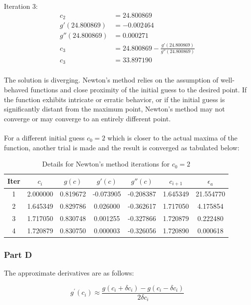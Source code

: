 \documentclass[12pt, a4paper]{article}
\numberwithin{equation}{section}
\begin{document}
Iteration 3:
\begin{equation}
\begin{align}
c_{2} &= 24.800869\\
g'(24.800869) &= -0.002464 \\
g''(24.800869) &= 0.000271 \\
c_{3} &= 24.800869 - \frac{g'(24.800869)}{g''(24.800869)}\\
c_{3} &= 33.897190\\
\end{align}    
\end{equation}


The solution is diverging. Newton's method relies on the assumption of well-behaved functions and close proximity of the initial guess to the desired point. If the function exhibits intricate or erratic behavior, or if the initial guess is significantly distant from the maximum point, Newton's method may not converge or may converge to an entirely different point.\\
\\
For a different initial guess $c_0 = 2$ which is closer to the actual maxima of the function, another trial is made and the result is converged as tabulated below:

\begin{table}[htbp]
  \centering
  \caption{Details for Newton's method iterations for $c_0 = 2$}
  \begin{tabular}{ccccccc}
    \hline
    Iter & $c_i$ & $g(c)$ & $g'(c)$ & $g''(c)$ & $c_{i+1}$ & $\epsilon_a$ \\ \hline
    1 & 2.000000 & 0.819672 & -0.073905 & -0.208387 & 1.645349 &  21.554770\\
    2 & 1.645349 & 0.829786 & 0.026000 & -0.362617 & 1.717050 &  4.175854\\
    3 & 1.717050 & 0.830748 & 0.001255 & -0.327866 & 1.720879 &  0.222480\\
    4 & 1.720879 & 0.830750 & 0.000003 & -0.326056 & 1.720890 &  0.000618\\
    \hline
  \end{tabular}
\end{table}


\subsubsection{Part D}
The approximate derivatives are as follows:

\begin{equation}
g^{\prime}\left(c_i\right) \approx \frac{g\left(c_i+\delta c_i\right)-g\left(c_i-\delta c_i\right)}{2 \delta c_i}
\end{equation}
\end{document}
